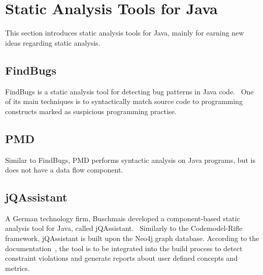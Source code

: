 \section{Static Analysis Tools for Java}

This section introduces static analysis tools for Java, mainly for earning new ideas regarding static analysis.


\subsection{FindBugs}

FindBugs is a static analysis tool for detecting bug patterns in Java code.~\cite{findbugs-website} One of its main techniques is to syntactically match source code to programming constructs marked as suspicious programming practise. ~\cite{rutar2004comparison}


\subsection{PMD}

Similar to FindBugs, PMD performs syntactic analysis on Java programs, but is does not have a data flow component. ~\cite{rutar2004comparison}


\subsection{jQAssistant}

A German technology firm, Buschmais developed a component-based static analysis tool for Java, called jQAssistant.~\cite{jqassistant-website} Similarly to the Codemodel-Rifle framework, jQAssistant is built upon the Neo4j graph database. According to the documentation~\cite{jqassistant-documentation}, the tool is to be integrated into the build process to detect constraint violations and generate reports about user defined concepts and metrics.

